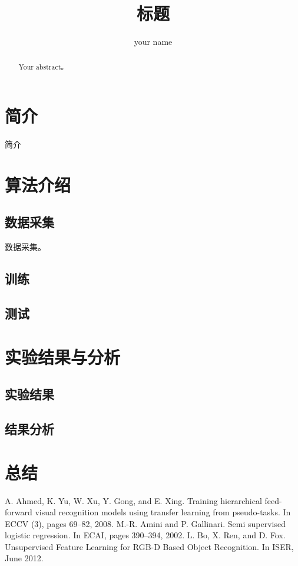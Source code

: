 \documentclass{ctexart}
\title{标题}
\author{your name}
\begin{document}
\maketitle


\begin{abstract}
	 Your abstract。
\end{abstract}

\section{简介}
简介
\section{算法介绍}
\subsection{数据采集}
    数据采集。

\subsection{训练}


\subsection{测试}


\section{实验结果与分析}
\subsection{实验结果}


\subsection{结果分析}


\section{总结}


\begin{flushleft}
\begin{thebibliography}{123456}  
\addtolength{\itemsep}{-1.5ex}
A. Ahmed, K. Yu, W. Xu, Y. Gong, and E. Xing. Training hierarchical feed-forward visual recognition models using transfer learning from pseudo-tasks. In ECCV (3), pages 69–82, 2008.
M.-R. Amini and P. Gallinari. Semi supervised logistic regression. In ECAI, pages 390–394, 2002.
 L. Bo, X. Ren, and D. Fox. Unsupervised Feature Learning for RGB-D Based Object Recognition. In ISER, June 2012.


\end{thebibliography} 

\end{flushleft}
\end{document}
